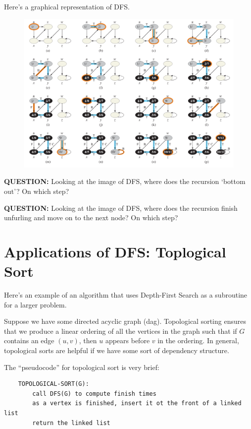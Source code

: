 \documentclass[12pt]{article}
\begin{document}
Here's a graphical representation of DFS.

\begin{figure}[h]
    \includegraphics[width=\textwidth]{dfs.png}
\end{figure}

\textbf{QUESTION:} Looking at the image of DFS, where does the recursion `bottom out'? On which step?

\textbf{QUESTION:} Looking at the image of DFS, where does the recursion finish unfurling and move on to the next node? On which step? 

\section*{Applications of DFS: Toplogical Sort}

Here's an example of an algorithm that uses Depth-First Search as a subroutine for a larger problem. 

Suppose we have some directed acyclic graph (dag). Topological sorting ensures that we produce a linear ordering of all the vertices in the graph such that if $G$ contains an edge $(u, v)$, then $u$ appears before $v$ in the ordering. In general, topological sorts are helpful if we have some sort of dependency structure. 

The ``pseudocode'' for topological sort is very brief:

\begin{verbatim}
    TOPOLOGICAL-SORT(G):
        call DFS(G) to compute finish times
        as a vertex is finished, insert it ot the front of a linked list
        return the linked list
\end{verbatim}
\end{document}
